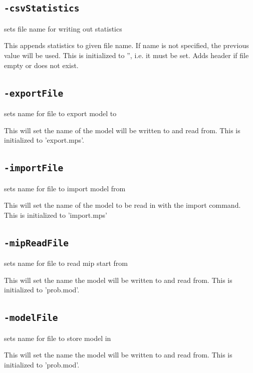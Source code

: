 \documentclass[11pt,a4paper]{article}
\begin{document}
\subsection*{\texttt{-csvStatistics}}

sets file name for writing out statistics

This appends statistics to given file name.  If name is not specified, the previous value will be used. This is initialized to '', i.e. it must be set. Adds header if file empty or does not exist.

\subsection*{\texttt{-exportFile}}

sets name for file to export model to

This will set the name of the model will be written to and read from. This is initialized to 'export.mps'. 

\subsection*{\texttt{-importFile}}

sets name for file to import model from

This will set the name of the model to be read in with the import command. This is initialized to 'import.mps'

\subsection*{\texttt{-mipReadFile}}

sets name for file to read mip start from

This will set the name the model will be written to and read from. This is initialized to 'prob.mod'. 

\subsection*{\texttt{-modelFile}}

sets name for file to store model in

This will set the name the model will be written to and read from. This is initialized to 'prob.mod'. 
\end{document}
